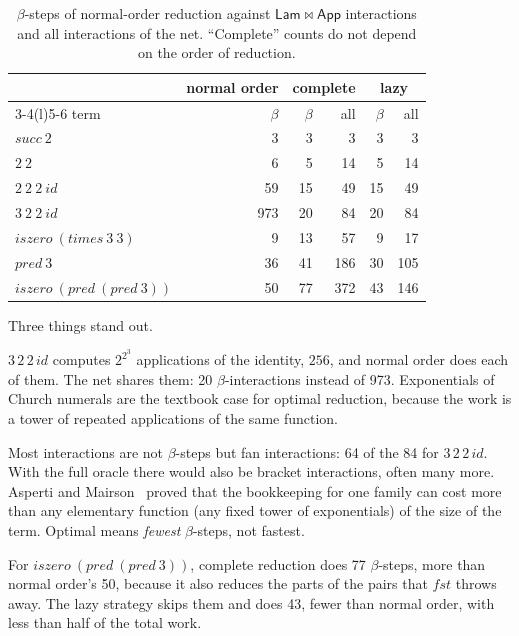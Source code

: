 \documentclass[11pt,a4paper]{article}
\newcommand{\ag}[1]{\mathsf{#1}}
\newcommand{\Lam}{\ag{Lam}}
\newcommand{\App}{\ag{App}}
\newcommand{\act}{\mathrel{\bowtie}}
\theoremstyle{definition}
\theoremstyle{plain}
\begin{document}
\begin{table}[t]
\centering
\begin{tabular}{@{}l r r r r r@{}}
\toprule
& normal order & \multicolumn{2}{c}{complete} & \multicolumn{2}{c}{lazy}\\
\cmidrule(lr){3-4}\cmidrule(l){5-6}
term & $\beta$ & $\beta$ & all & $\beta$ & all\\
\midrule
$\mathit{succ}\ 2$ & 3 & 3 & 3 & 3 & 3\\
$2\ 2$ & 6 & 5 & 14 & 5 & 14\\
$2\ 2\ 2\ \mathit{id}$ & 59 & 15 & 49 & 15 & 49\\
$3\ 2\ 2\ \mathit{id}$ & 973 & 20 & 84 & 20 & 84\\
$\mathit{iszero}\ (\mathit{times}\ 3\ 3)$ & 9 & 13 & 57 & 9 & 17\\
$\mathit{pred}\ 3$ & 36 & 41 & 186 & 30 & 105\\
$\mathit{iszero}\ (\mathit{pred}\ (\mathit{pred}\ 3))$ & 50 & 77 & 372 & 43 & 146\\
\bottomrule
\end{tabular}
\caption{$\beta$-steps of normal-order reduction against $\Lam\act\App$
interactions and all interactions of the net. ``Complete'' counts do not
depend on the order of reduction.}
\label{tab:measure}
\end{table}

\noindent
Three things stand out.

\begin{description}[itemsep=3pt, font=\normalfont\itshape]
\item[Sharing pays, sometimes enormously.] $3\,2\,2\,\mathit{id}$ computes
  $2^{2^3}$ applications of the identity, $256$, and normal order does each
  of them. The net shares them: 20 $\beta$-interactions instead of 973.
  Exponentials of Church numerals are the textbook case for optimal
  reduction, because the work is a tower of repeated applications of the
  same function.
\item[Bookkeeping is not free.] Most interactions are not $\beta$-steps but
  fan interactions: 64 of the 84 for $3\,2\,2\,\mathit{id}$. With the full
  oracle there would also be bracket interactions, often many more. Asperti
  and Mairson~\cite{am98} proved that the bookkeeping for one family can
  cost more than any elementary function (any fixed tower of exponentials)
  of the size of the term. Optimal means \emph{fewest} $\beta$-steps, not
  fastest.
\item[Garbage costs, unless the strategy avoids it.] For
  $\mathit{iszero}\ (\mathit{pred}\ (\mathit{pred}\ 3))$, complete reduction
  does 77 $\beta$-steps, more than normal order's 50, because it also
  reduces the parts of the pairs that $\mathit{fst}$ throws away. The lazy
  strategy skips them and does 43, fewer than normal order, with less than
  half of the total work.
\end{description}
\end{document}
